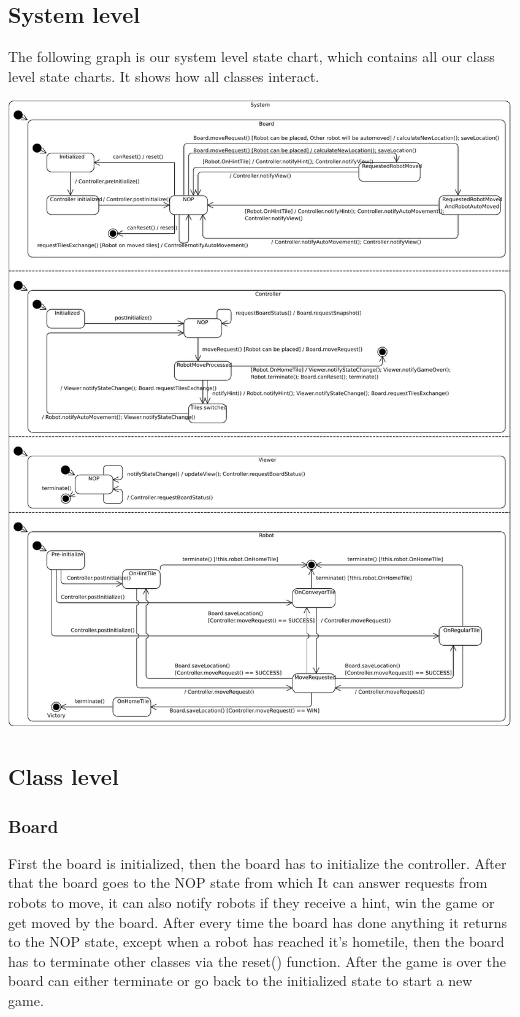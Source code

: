 \subsection{System level}
	The following graph is our system level state chart, which contains all our class level state charts. It shows how all classes interact.

	\includegraphics[width=\linewidth]{statecharts/system.pdf}

\subsection{Class level}
	\subsubsection{Board}
	First the board is initialized, then the board has to initialize the controller. After that the board goes to the NOP state from which It can answer requests from robots to move, it can also notify robots if they receive a hint, win the game or get moved by the board. After every time the board has done anything it returns to the NOP state, except when a robot has reached it's hometile, then the board has to terminate other classes via the reset() function. After the game is over the board can either terminate or go back to the initialized state to start a new game.
	
